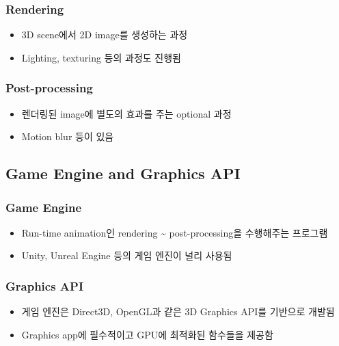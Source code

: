 \subsubsection*{Rendering}
\begin{itemize}
    \item 3D scene에서 2D image를 생성하는 과정
    \item Lighting, texturing 등의 과정도 진행됨
\end{itemize}

\subsubsection*{Post-processing}
\begin{itemize}
    \item 렌더링된 image에 별도의 효과를 주는 optional 과정
    \item Motion blur 등이 있음
\end{itemize}

\subsection{Game Engine and Graphics API}

\subsubsection*{Game Engine}
\begin{itemize}
    \item Run-time animation인 rendering {\textasciitilde} post-processing을 수행해주는 프로그램
    \item Unity, Unreal Engine 등의 게임 엔진이 널리 사용됨
\end{itemize}

\subsubsection*{Graphics API}
\begin{itemize}
    \item 게임 엔진은 Direct3D, OpenGL과 같은 3D Graphics API를 기반으로 개발됨
    \item Graphics app에 필수적이고 GPU에 최적화된 함수들을 제공함
\end{itemize}
